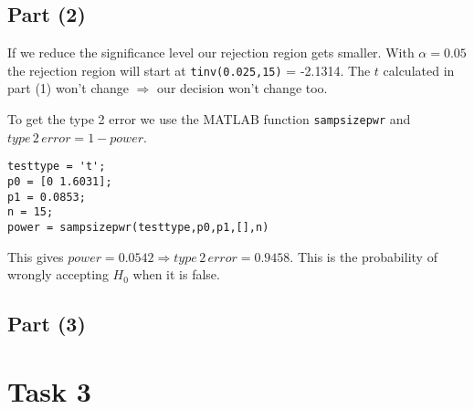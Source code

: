 \documentclass[british,a4paper,order=firstname]{mathscript}
\begin{document}
\subsection{Part (2)}
If we reduce the significance level our rejection region gets smaller. With $\alpha = 0.05$ the rejection region will start at \texttt{tinv(0.025,15)} = -2.1314. The $t$ calculated in part (1) won't change $\Rightarrow$ our decision won't change too.

To get the type 2 error we use the MATLAB function \texttt{sampsizepwr} and $type\, 2\, error = 1-power$.
\begin{lstlisting}
testtype = 't';
p0 = [0 1.6031];
p1 = 0.0853;
n = 15;
power = sampsizepwr(testtype,p0,p1,[],n)
\end{lstlisting}
This gives $power = 0.0542\Rightarrow type\, 2\, error = 0.9458$. This is the probability of wrongly accepting $H_0$ when it is false.

\subsection{Part (3)}

\pagebreak
\section{Task 3}
\end{document}

